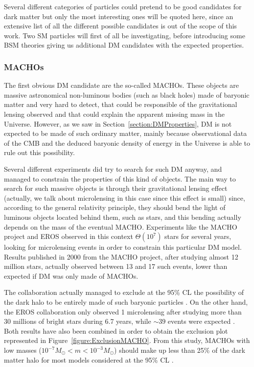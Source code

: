 \documentclass[a4paper, 10pt, openright]{report}
\begin{document}
Several different categories of particles could pretend to be good candidates for dark matter but only the most interesting ones will be quoted here, since an extensive list of all the different possible candidates is out of the scope of this work. Two \ac{SM} particles will first of all be investigating, before introducing some \ac{BSM} theories giving us additional \ac{DM} candidates with the expected properties.

\subsubsection*{\acfp{MACHO}}
The first obvious \ac{DM} candidate are the so-called \acp{MACHO}. These objects are massive astronomical non-luminous bodies (such as black holes) made of baryonic matter and very hard to detect, that could be responsible of the gravitational lensing observed and that could explain the apparent missing mass in the Universe. However, as we saw in Section~\ref{section:DMProperties}, \ac{DM} is not expected to be made of such ordinary matter, mainly because observational data of the \ac{CMB} and the deduced baryonic density of energy in the Universe is able to rule out this possibility.

Several different experiments did try to search for such \ac{DM} anyway, and managed to constrain the properties of this kind of objects. The main way to search for such massive objects is through their gravitational lensing effect (actually, we talk about microlensing in this case since this effect is small) since, according to the general relativity principle, they should bend the light of luminous objects located behind them, such as stars, and this bending actually depends on the mass of the eventual \ac{MACHO}. Experiments like the \ac{MACHO} project and EROS observed in this context $\Theta (10^7)$ stars for several years, looking for microlensing events in order to constrain this particular \ac{DM} model. Results published in 2000 from the MACHO project, after studying almost 12 million stars, actually observed between 13 and 17 such events, lower than expected if \ac{DM} was only made of \acp{MACHO}. 

The collaboration actually managed to exclude at the 95\% \ac{CL} the possibility of the dark halo to be entirely made of such baryonic particles \cite{MACHOProject}. On the other hand, the EROS collaboration only observed 1 microlensing after studying more than 30 millions of bright stars during 6.7 years, while $\sim39$ events were expected \cite{EROS}. Both results have also been combined in order to obtain the exclusion plot represented in Figure~\ref{figure:ExclusionMACHO}. From this study, \acp{MACHO} with low masses ($10^{-7}M_\odot < m < 10^{-3}M_\odot$) should make up less than 25\% of the dark matter halo for most models considered at the 95\% \ac{CL} \cite{ExclusionMACHO}.
\end{document}
